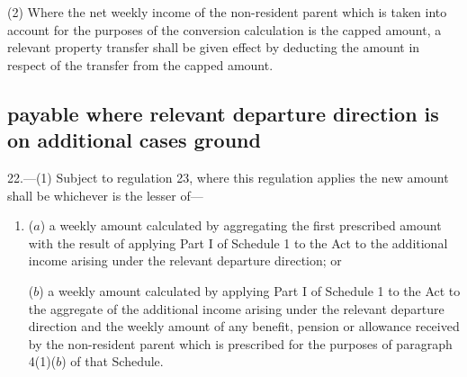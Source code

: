 \documentclass[12pt,a4paper]{article}
\begin{document}
(2) Where the net weekly income of the non-resident parent which is taken into account for the purposes of the conversion calculation is the capped amount, a relevant property transfer shall be given effect by deducting the amount in respect of the transfer from the capped amount.


\subsection[22. Effect on conversion calculation—maximum amount payable where relevant departure direction is on additional cases ground]{\sloppy {} payable where relevant departure direction is on additional cases ground}

22.---(1)  Subject to regulation 23, where this regulation applies 
the new amount  %
shall be whichever is the lesser of—
\begin{enumerate}\item[]
%

($a$) a weekly amount calculated by aggregating the first prescribed amount with the result of applying Part I of Schedule 1 to the Act to the additional income arising under the relevant departure direction; or

($b$) a weekly amount calculated by applying Part I of Schedule 1 to the Act to the aggregate of the additional income arising under the relevant departure direction and the weekly amount of any benefit, pension or allowance received by the non-resident parent which is prescribed for the purposes of paragraph 4(1)($b$)  of that Schedule.
\end{enumerate}
\end{document}

